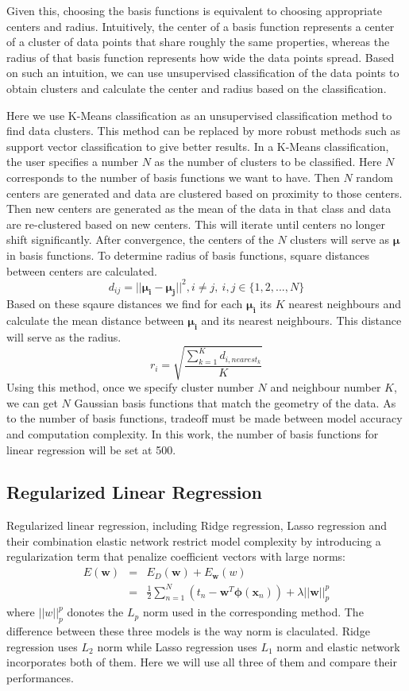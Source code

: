 \documentclass[11pt]{article}
\begin{document}
Given this, choosing the basis functions is equivalent to choosing appropriate centers and radius. Intuitively, the center of a basis function represents a center of a cluster of data points that share roughly the same properties, whereas the radius of that basis function represents how wide the data points spread. Based on such an intuition, we can use unsupervised classification of the data points to obtain clusters and calculate the center and radius based on the classification.

Here we use K-Means classification as an unsupervised classification method to find data clusters. This method can be replaced by more robust methods such as support vector classification to give better results. In a K-Means classification, the user specifies a number $N$ as the number of clusters to be classified. Here $N$ corresponds to the number of basis functions we want to have. Then $N$ random centers are generated and data are clustered based on proximity to those centers. Then new centers are generated as the mean of the data in that class and data are re-clustered based on new centers. This will iterate until centers no longer shift significantly. After convergence, the centers of the $N$ clusters will serve as $\boldsymbol{\mu}$ in basis functions. To determine radius of basis functions, square distances between centers are calculated.
$$d_{ij} = ||\boldsymbol{\mu_i} - \boldsymbol{\mu_j}||^2, i \neq j, \ i,j \in \{1, 2, ..., N \}$$
Based on these sqaure distances we find for each $\boldsymbol{\mu_i}$ its $K$ nearest neighbours and calculate the mean distance between $\boldsymbol{\mu_i}$ and its nearest neighbours. This distance will serve as the radius.
$$r_i = \sqrt{\frac{\sum_{k = 1}^K d_{i,nearest_k}}{K}}$$
Using this method, once we specify cluster number $N$ and neighbour number $K$, we can get $N$ Gaussian basis functions that match the geometry of the data. As to the number of basis functions, tradeoff must be made between model accuracy and computation complexity. In this work, the number of basis functions for linear regression will be set at 500.

\subsection{Regularized Linear Regression}\label{linear regression}
Regularized linear regression, including Ridge regression, Lasso regression and their combination elastic network restrict model complexity by introducing a regularization term that penalize coefficient vectors with large norms: 
\begin{eqnarray}
E(\textbf{w}) &=& E_D(\textbf{w}) + E_\textbf{w}(w) \\
              &=& \frac{1}{2}\sum_{n=1}^N(t_n - \textbf{w}^T\boldsymbol{\phi} (\textbf{x}_n)) + \lambda||\textbf{w}||_p^p
\end{eqnarray}
where $||w||_p^p$ donotes the $L_p$ norm used in the corresponding method. The difference between these three models is the way norm is claculated. Ridge regression uses $L_2$ norm while Lasso regression uses $L_1$ norm and elastic network incorporates both of them. Here we will use all three of them and compare their performances.
\end{document}

